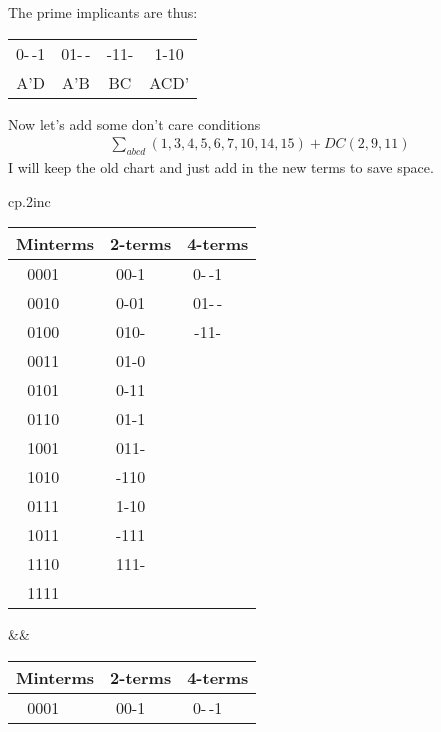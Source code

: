 The prime implicants are thus:

\begin{tabular}{cccc}
0-$\,$-1 & 01-$\,$- &  -11- & 1-10 \\
A'D      & A'B      & BC    & ACD' \\
\end{tabular}

Now let's add some don't care conditions
\begin{eqnarray}
\sum_{abcd}(1,3,4,5,6,7,10,14,15)+DC(2,9,11)
\end{eqnarray}
I will keep the old chart and just add in the new terms to save space.

\vspace{.1in}

\begin{tabular}{cp{.2in}c}
\begin{tabular}{cp{.1in}cp{.1in}cp{.1in}}
\multicolumn{2}{c}{Minterms} & \multicolumn{2}{c}{2-terms}  & \multicolumn{2}{c}{4-terms} \\\hline
0001 & \checkmark & 00-1 & \checkmark & 0-$\,$-1 &  \\
\textcolor[rgb]{0.00,0.00,1.00}{0010} &  & 0-01 & \checkmark & 01-$\,$- &  \\
0100 & \checkmark & 010- & \checkmark & -11- &  \\\cline{1-2}
0011 & \checkmark & 01-0 & \checkmark &  &  \\\cline{3-4}
0101 & \checkmark & 0-11 & \checkmark &      &  \\
0110 & \checkmark & 01-1 & \checkmark &      &  \\
\textcolor[rgb]{0.00,0.00,1.00}{1001} &  & 011- & \checkmark &  &  \\
1010 & \checkmark & -110 & \checkmark &  &  \\\cline{1-2}
0111 & \checkmark & 1-10 &            &  &  \\\cline{3-4}
\textcolor[rgb]{0.00,0.00,1.00}{1011} &  & -111 & \checkmark &  &  \\
1110     & \checkmark & 111- & \checkmark &  &  \\\cline{1-2}
1111     & \checkmark &      &            &  &  \\
\end{tabular}
&&
\begin{tabular}{cp{.1in}cp{.1in}cp{.1in}}
\multicolumn{2}{c}{Minterms} & \multicolumn{2}{c}{2-terms}  & \multicolumn{2}{c}{4-terms} \\\hline
0001 & \checkmark & 00-1 & \checkmark & 0-$\,$-1 &  \\

\end{tabular}
\end{tabular}
